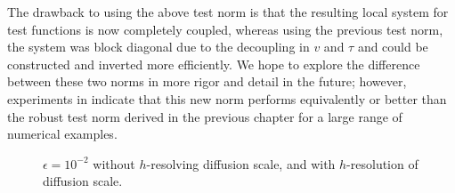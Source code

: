 The drawback to using the above test norm is that the resulting local system for test functions is now completely coupled, whereas using the previous test norm, the system was block diagonal due to the decoupling in $v$ and $\tau$ and could be constructed and inverted more efficiently.  We hope to explore the difference between these two norms in more rigor and detail in the future; however, experiments in \cite{localConservationDPG} indicate that this new norm performs equivalently or better than the robust test norm derived in the previous chapter for a large range of numerical examples.

\begin{figure}[!h]
\centering
{}
\caption{$\epsilon = 10^{-2}$ without $h$-resolving diffusion scale, and with $h$-resolution of diffusion scale.}
\label{fig:newNorm}
\end{figure}

